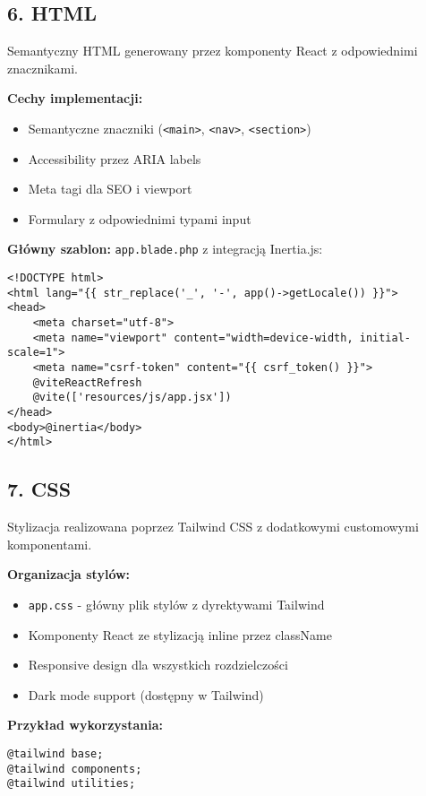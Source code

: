 \subsection{6. HTML}

Semantyczny HTML generowany przez komponenty React z odpowiednimi znacznikami.

\textbf{Cechy implementacji:}
\begin{itemize}
    \item Semantyczne znaczniki (\texttt{<main>}, \texttt{<nav>}, \texttt{<section>})
    \item Accessibility przez ARIA labels
    \item Meta tagi dla SEO i viewport
    \item Formulary z odpowiednimi typami input
\end{itemize}

\textbf{Główny szablon:} \texttt{app.blade.php} z integracją Inertia.js:
\begin{verbatim}
<!DOCTYPE html>
<html lang="{{ str_replace('_', '-', app()->getLocale()) }}">
<head>
    <meta charset="utf-8">
    <meta name="viewport" content="width=device-width, initial-scale=1">
    <meta name="csrf-token" content="{{ csrf_token() }}">
    @viteReactRefresh
    @vite(['resources/js/app.jsx'])
</head>
<body>@inertia</body>
</html>
\end{verbatim}

\subsection{7. CSS}

Stylizacja realizowana poprzez Tailwind CSS z dodatkowymi customowymi komponentami.

\textbf{Organizacja stylów:}
\begin{itemize}
    \item \texttt{app.css} - główny plik stylów z dyrektywami Tailwind
    \item Komponenty React ze stylizacją inline przez className
    \item Responsive design dla wszystkich rozdzielczości
    \item Dark mode support (dostępny w Tailwind)
\end{itemize}

\textbf{Przykład wykorzystania:}
\begin{verbatim}
@tailwind base;
@tailwind components;
@tailwind utilities;
\end{verbatim}

